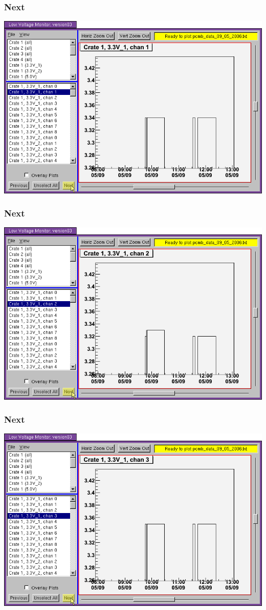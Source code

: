 \documentclass[12pt,compress]{beamer}
\begin{document}
\begin{frame}
\frametitle{Next}
\begin{center}
\includegraphics[width=0.9\linewidth]{13.png}
\end{center}
\end{frame}

\begin{frame}
\frametitle{Next}
\begin{center}
\includegraphics[width=0.9\linewidth]{14.png}
\end{center}
\end{frame}

\begin{frame}
\frametitle{Next}
\begin{center}
\includegraphics[width=0.9\linewidth]{15.png}
\end{center}
\end{frame}
\end{document}
